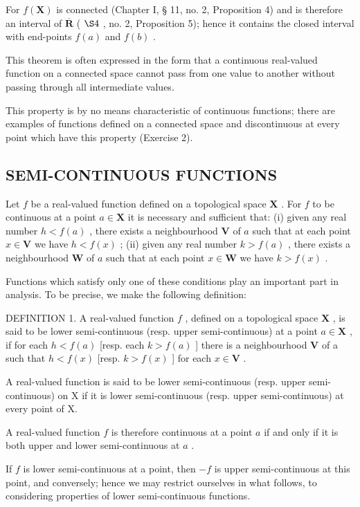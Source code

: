 For \(f(\mathbf{X})\) is connected (Chapter I, § 11, no. 2, Proposition 4) and is therefore an interval of \(\overline{\mathbf{R}}\) ( \(\S 4\) , no. 2, Proposition 5); hence it contains the closed interval with end-points \(f(a)\) and \(f(b)\) .

This theorem is often expressed in the form that a continuous real-valued function on a connected space cannot pass from one value to another without passing through all intermediate values.

This property is by no means characteristic of continuous functions; there are examples of functions defined on a connected space and discontinuous at every point which have this property (Exercise 2).

\subsection{SEMI-CONTINUOUS FUNCTIONS}

Let \(f\) be a real-valued function defined on a topological space \(\mathbf{X}\) . For \(f\) to be continuous at a point \(a \in \mathbf{X}\) it is necessary and sufficient that: (i) given any real number \(h < f(a)\) , there exists a neighbourhood \(\mathbf{V}\) of \(a\) such that at each point \(x \in \mathbf{V}\) we have \(h < f(x)\) ; (ii) given any real number \(k > f(a)\) , there exists a neighbourhood \(\mathbf{W}\) of \(a\) such that at each point \(x \in \mathbf{W}\) we have \(k > f(x)\) .

Functions which satisfy only one of these conditions play an important part in analysis. To be precise, we make the following definition:

DEFINITION 1. A real-valued function \(f\) , defined on a topological space \(\mathbf{X}\) , is said to be lower semi-continuous (resp. upper semi-continuous) at a point \(a \in \mathbf{X}\) , if for each \(h < f(a)\) {[}resp. each \(k > f(a)\) {]} there is a neighbourhood \(\mathbf{V}\) of a such that \(h < f(x)\) {[}resp. \(k > f(x)\) {]} for each \(x \in \mathbf{V}\) .

A real-valued function is said to be lower semi-continuous (resp. upper semi-continuous) on X if it is lower semi-continuous (resp. upper semi-continuous) at every point of X.

A real-valued function \(f\) is therefore continuous at a point \(a\) if and only if it is both upper and lower semi-continuous at \(a\) .

If \(f\) is lower semi-continuous at a point, then \(-f\) is upper semi-continuous at this point, and conversely; hence we may restrict ourselves in what follows, to considering properties of lower semi-continuous functions.

